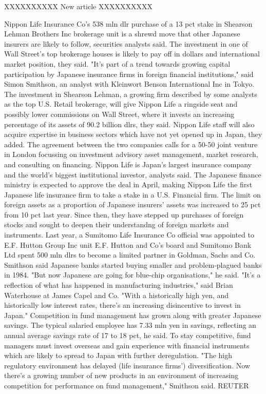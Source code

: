 \documentclass{article}
\begin{document}
\begin{pythonOutput}
['acq']

XXXXXXXXXX
New article
XXXXXXXXXX

Nippon Life Insurance Co's 538 mln dlr
purchase of a 13 pct stake in Shearson Lehman Brothers Inc
brokerage unit is a shrewd move that other Japanese insurers
are likely to follow, securities analysts said.
    The investment in one of Wall Street's top brokerage houses
is likely to pay off in dollars and international market
position, they said. "It's part of a trend towards growing
capital participation by Japanese insurance firms in foreign
financial institutions," said Simon Smithson, an analyst with
Kleinwort Benson International Inc in Tokyo.
    The investment in Shearson Lehman, a growing firm described
by some analysts as the top U.S. Retail brokerage, will give
Nippon Life a ringside seat and possibly lower commissions on
Wall Street, where it invests an increasing percentage of its
assets of 90.2 billion dlrs, they said.
    Nippon Life staff will also acquire expertise in business
sectors which have not yet opened up in Japan, they added.
    The agreement between the two companies calls for a 50-50
joint venture in London focussing on investment advisory asset
management, market research, and consulting on financing.
    Nippon Life is Japan's largest insurance company and the
world's biggest institutional investor, analysts said.
    The Japanese finance ministry is expected to approve the
deal in April, making Nippon Life the first Japanese life
insurance firm to take a stake in a U.S. Financial firm.
    The limit on foreign assets as a proportion of Japanese
insurers' assets was increased to 25 pct from 10 pct last year.
Since then, they have stepped up purchases of foreign stocks
and sought to deepen their understandng of foreign markets and
instruments.
    Last year, a Sumitomo Life Insurance Co official was
appointed to E.F. Hutton Group Inc unit E.F. Hutton and Co's
board and Sumitomo Bank Ltd spent 500 mln dlrs to become a
limited partner in Goldman, Sachs and Co.
    Smithson said Japanese banks started buying smaller and
problem-plagued banks in 1984. "But now Japanese are going for
blue-chip organisations," he said.
    "It's a reflection of what has happened in manufacturing
industries," said Brian Waterhouse at James Capel and Co. "With a
historically high yen, and historically low interest rates,
there's an increasing disincentive to invest in Japan."
    Competition in fund management has grown along with greater
Japanese savings. The typical salaried employee has 7.33 mln
yen in savings, reflecting an annual average savings rate of 17
to 18 pct, he said.
    To stay competitive, fund managers must invest overseas and
gain experience with financial instruments which are likely to
spread to Japan with further deregulation. "The high regulatory
environment has delayed (life insurance firms')
diversification. Now there's a growing number of new products
in an environment of increasing competition for performance on
fund management," Smithson said.
 REUTER


\end{pythonOutput}
\end{document}
